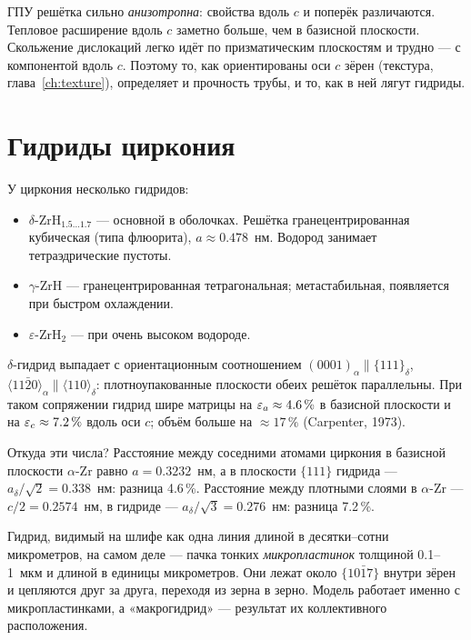
\begin{idea}
ГПУ решётка сильно \emph{анизотропна}: свойства вдоль $c$ и поперёк различаются. Тепловое расширение вдоль
$c$ заметно больше, чем в базисной плоскости. Скольжение дислокаций легко идёт по призматическим плоскостям и
трудно --- с компонентой вдоль $c$. Поэтому то, как ориентированы оси $c$ зёрен (текстура, глава~\ref{ch:texture}),
определяет и прочность трубы, и то, как в ней лягут гидриды.
\end{idea}

\section{Гидриды циркония}

У циркония несколько гидридов:
\begin{itemize}
\item $\delta$-ZrH$_{1.5\ldots1.7}$ --- основной в оболочках. Решётка гранецентрированная кубическая (типа
  флюорита), $a\approx0.478$~нм. Водород занимает тетраэдрические пустоты.
\item $\gamma$-ZrH --- гранецентрированная тетрагональная; метастабильная, появляется при быстром охлаждении.
\item $\varepsilon$-ZrH$_2$ --- при очень высоком водороде.
\end{itemize}
$\delta$-гидрид выпадает с ориентационным соотношением $(0001)_\alpha\parallel\{111\}_\delta$,
$\langle11\bar20\rangle_\alpha\parallel\langle110\rangle_\delta$: плотноупакованные плоскости обеих решёток
параллельны. При таком сопряжении гидрид шире матрицы на $\varepsilon_a\approx4.6\,\%$ в базисной плоскости и на
$\varepsilon_c\approx7.2\,\%$ вдоль оси $c$; объём больше на $\approx17\,\%$ (Carpenter, 1973).

Откуда эти числа? Расстояние между соседними атомами циркония в базисной плоскости $\alpha$-Zr равно $a = 0.3232$~нм,
а в плоскости $\{111\}$ гидрида --- $a_\delta/\sqrt2 = 0.338$~нм: разница 4.6\,\%. Расстояние между плотными
слоями в $\alpha$-Zr --- $c/2 = 0.2574$~нм, в гидриде --- $a_\delta/\sqrt3 = 0.276$~нм: разница 7.2\,\%.

\begin{zrbox}
Гидрид, видимый на шлифе как одна линия длиной в десятки--сотни микрометров, на самом деле --- пачка тонких
\emph{микропластинок} толщиной 0.1--1~мкм и длиной в единицы микрометров. Они лежат около $\{10\bar17\}$ внутри зёрен
и цепляются друг за друга, переходя из зерна в зерно. Модель работает именно с микропластинками, а «макрогидрид»
--- результат их коллективного расположения.
\end{zrbox}

